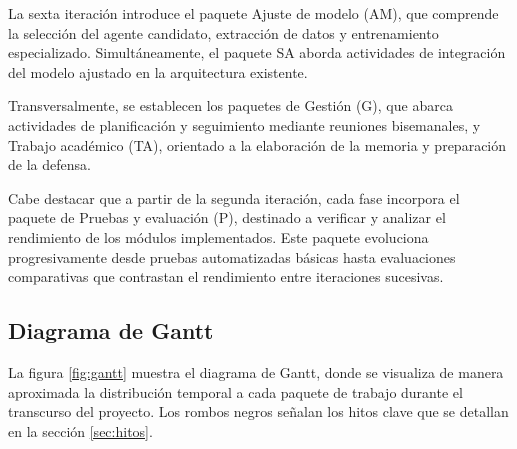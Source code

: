 La sexta iteración introduce el paquete Ajuste de modelo (AM), que comprende la selección del agente candidato, extracción de datos y entrenamiento especializado. Simultáneamente, el paquete SA aborda actividades de integración del modelo ajustado en la arquitectura existente.

Transversalmente, se establecen los paquetes de Gestión (G), que abarca actividades de planificación y seguimiento mediante reuniones bisemanales, y Trabajo académico (TA), orientado a la elaboración de la memoria y preparación de la defensa.

Cabe destacar que a partir de la segunda iteración, cada fase incorpora el paquete de Pruebas y evaluación (P), destinado a verificar y analizar el rendimiento de los módulos implementados. Este paquete evoluciona progresivamente desde pruebas automatizadas básicas hasta evaluaciones comparativas que contrastan el rendimiento entre iteraciones sucesivas.

\subsection{Diagrama de Gantt}

La figura \ref{fig:gantt} muestra el diagrama de Gantt, donde se visualiza de manera aproximada la distribución temporal a cada paquete de trabajo durante el transcurso del proyecto. Los rombos negros señalan los hitos clave que se detallan en la sección \ref{sec:hitos}.


